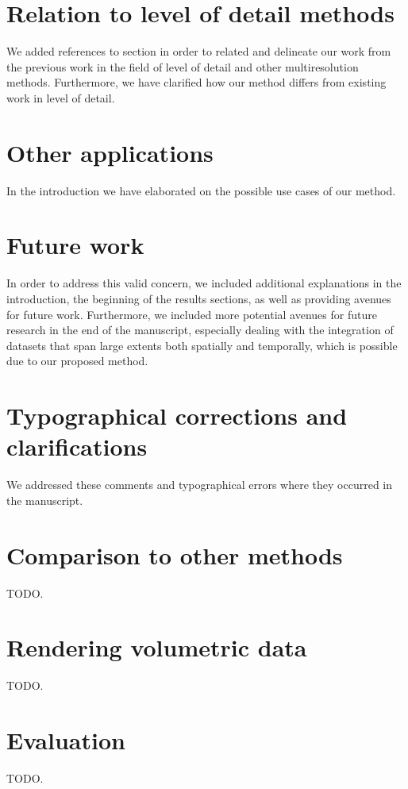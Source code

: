 \documentclass{article}
\begin{document}
\section{Relation to level of detail methods}\label{concern:lod}
We added references to section in order to related and delineate our work from the 
previous work in the field of level of detail and other multiresolution methods.
Furthermore, we have clarified how our method differs from existing work in level of detail.

\section{Other applications}\label{concern:applications}
In the introduction we have elaborated on the possible use cases of our method.

\section{Future work}\label{concern:future-work}
In order to address this valid concern, we included additional explanations in the
introduction, the beginning of the results sections, as well as providing avenues for
future work. Furthermore, we included more potential avenues for future research in the
end of the manuscript, especially dealing with the integration of datasets that span large
extents both spatially and temporally, which is possible due to our proposed method.

\section{Typographical corrections and clarifications}\label{concern:typos}
We addressed these comments and typographical errors where they occurred in the
manuscript.

\section{Comparison to other methods}\label{concern:comparisons}
TODO.

\section{Rendering volumetric data}\label{concern:volumetric}
TODO.

\section{Evaluation}\label{concern:evaluation}
TODO.
\end{document}
